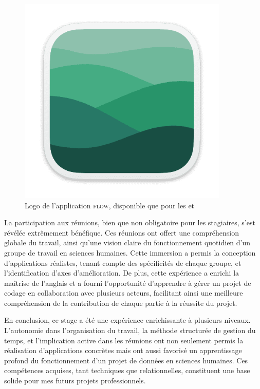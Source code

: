         \begin{figure}[h!]
            \centering
            \includegraphics[width=10cm]{02_images/part_03/02_flow_macos_logo.png}
            \caption{Logo de l'application \textsc{flow}, disponible que pour les  et }
        \end{figure}

    La participation aux réunions, bien que non obligatoire pour les stagiaires, s'est révélée extrêmement bénéfique. Ces réunions ont offert une compréhension globale du travail, ainsi qu'une vision claire du fonctionnement quotidien d'un groupe de travail en sciences humaines. Cette immersion a permis la conception d'applications réalistes, tenant compte des spécificités de chaque groupe, et l'identification d'axes d'amélioration. De plus, cette expérience a enrichi la maîtrise de l'anglais et a fourni l'opportunité d'apprendre à gérer un projet de codage en collaboration avec plusieurs acteurs, facilitant ainsi une meilleure compréhension de la contribution de chaque partie à la réussite du projet.

    En conclusion, ce stage a été une expérience enrichissante à plusieurs niveaux. L’autonomie dans l’organisation du travail, la méthode structurée de gestion du temps, et l’implication active dans les réunions ont non seulement permis la réalisation d’applications concrètes mais ont aussi favorisé un apprentissage profond du fonctionnement d’un projet de données en sciences humaines. Ces compétences acquises, tant techniques que relationnelles, constituent une base solide pour mes futurs projets professionnels.